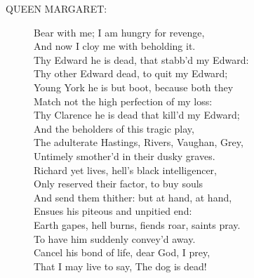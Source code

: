 \documentclass{article}
\begin{document}
\begin{description}
\item[QUEEN MARGARET:] 
\hspace{1pt}Bear with me; I am hungry for revenge,\\
\hspace{1pt}And now I cloy me with beholding it.\\
\hspace{1pt}Thy Edward he is dead, that stabb'd my Edward:\\
\hspace{1pt}Thy other Edward dead, to quit my Edward;\\
\hspace{1pt}Young York he is but boot, because both they\\
\hspace{1pt}Match not the high perfection of my loss:\\
\hspace{1pt}Thy Clarence he is dead that kill'd my Edward;\\
\hspace{1pt}And the beholders of this tragic play,\\
\hspace{1pt}The adulterate Hastings, Rivers, Vaughan, Grey,\\
\hspace{1pt}Untimely smother'd in their dusky graves.\\
\hspace{1pt}Richard yet lives, hell's black intelligencer,\\
\hspace{1pt}Only reserved their factor, to buy souls\\
\hspace{1pt}And send them thither: but at hand, at hand,\\
\hspace{1pt}Ensues his piteous and unpitied end:\\
\hspace{1pt}Earth gapes, hell burns, fiends roar, saints pray.\\
\hspace{1pt}To have him suddenly convey'd away.\\
\hspace{1pt}Cancel his bond of life, dear God, I prey,\\
\hspace{1pt}That I may live to say, The dog is dead!\\
\end{description}
\end{document}
